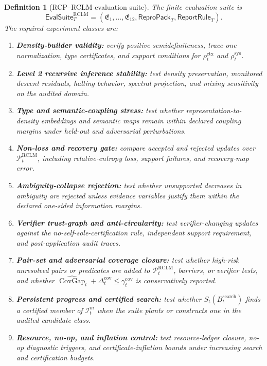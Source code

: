 \documentclass[11pt,a4paper]{article}
\newtheorem{definition}[theorem]{Definition}
\newcommand{\Pcal}{\mathcal P}
\newcommand{\RCLM}{\mathrm{RCLM}}
\newcommand{\sys}{\mathrm{sys}}
\newcommand{\ctx}{\mathrm{ctx}}
\newcommand{\search}{\mathrm{search}}
\newcommand{\cov}{\mathrm{cov}}
\begin{document}
\begin{definition}[RCP--RCLM evaluation suite]
The finite evaluation suite is
\[
\mathsf{EvalSuite}^{\RCLM}_T=
(\mathfrak E_1,\ldots,\mathfrak E_{12},\mathsf{ReproPack}_T,\mathsf{ReportRule}_T).
\]
The required experiment classes are:
\begin{enumerate}[label=\textbf{E\arabic*.}, leftmargin=2em]
    \item \textbf{Density-builder validity:} verify positive semidefiniteness, trace-one normalization, type certificates, and support conditions for \(\rho_t^{\ctx}\) and \(\rho_t^{\sys}\).
    \item \textbf{Level 2 recursive inference stability:} test density preservation, monitored descent residuals, halting behavior, spectral projection, and mixing sensitivity on the audited domain.
    \item \textbf{Type and semantic-coupling stress:} test whether representation-to-density embeddings and semantic maps remain within declared coupling margins under held-out and adversarial perturbations.
    \item \textbf{Non-loss and recovery gate:} compare accepted and rejected updates over \(\Pcal_t^{\RCLM}\), including relative-entropy loss, support failures, and recovery-map error.
    \item \textbf{Ambiguity-collapse rejection:} test whether unsupported decreases in ambiguity are rejected unless evidence variables justify them within the declared one-sided information margins.
    \item \textbf{Verifier trust-graph and anti-circularity:} test verifier-changing updates against the no-self-sole-certification rule, independent support requirement, and post-application audit traces.
    \item \textbf{Pair-set and adversarial coverage closure:} test whether high-risk unresolved pairs or predicates are added to \(\Pcal_t^{\RCLM}\), barriers, or verifier tests, and whether \(\widehat{\operatorname{CovGap}}_t+\Delta_t^{\cov}\le\gamma_t^{\cov}\) is conservatively reported.
    \item \textbf{Persistent progress and certified search:} test whether \(S_t(B_t^{\search})\) finds a certified member of \(\mathcal I_t^m\) when the suite plants or constructs one in the audited candidate class.
    \item \textbf{Resource, no-op, and inflation control:} test resource-ledger closure, no-op diagnostic triggers, and certificate-inflation bounds under increasing search and certification budgets.

\end{enumerate}
\end{definition}
\end{document}
